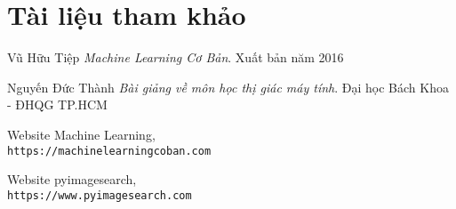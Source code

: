 \section{Tài liệu tham khảo}
\begin{thebibliography}{9}
    Vũ Hữu Tiệp
    \textit{Machine Learning Cơ Bản}. 
    Xuất bản năm 2016

    Nguyến Đức Thành
    \textit{Bài giảng về môn học thị giác máy tính}. 
    Đại học Bách Khoa - ĐHQG TP.HCM
     
    Website Machine Learning,
    \\\texttt{https://machinelearningcoban.com}

    Website pyimagesearch,
    \\\texttt{https://www.pyimagesearch.com}

\end{thebibliography}
